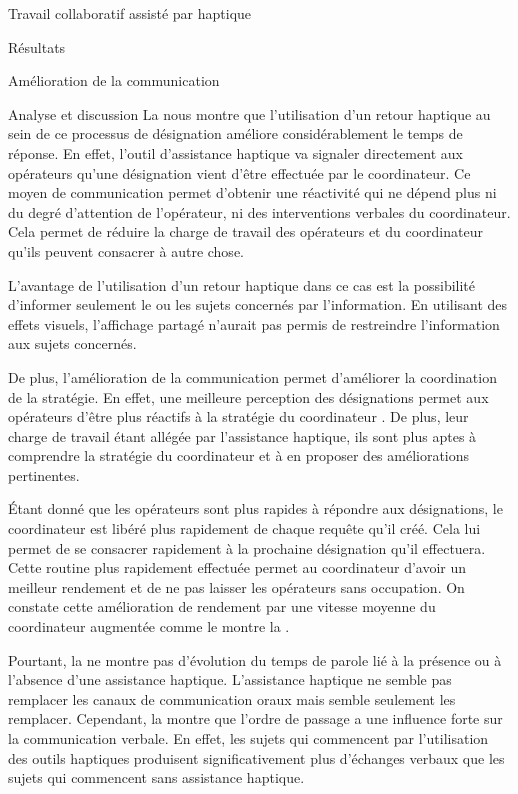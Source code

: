 \documentclass[myfrancais,ngerman,english,frenchb]{mythesis}
\begin{document}
\begin{mychapter}{Travail collaboratif assisté par haptique}
\begin{mysection}{Résultats}
\begin{mysubsection}{Amélioration de la communication}
\begin{mysubsubsection}{Analyse et discussion}
					La  nous montre que l'utilisation d'un retour haptique au sein de ce processus de désignation améliore considérablement le temps de réponse.
					En effet, l'outil d'assistance haptique va signaler directement aux opérateurs qu'une désignation vient d'être effectuée par le coordinateur.
					Ce moyen de communication permet d'obtenir une réactivité qui ne dépend plus ni du degré d'attention de l'opérateur, ni des interventions verbales du coordinateur.
					Cela permet de réduire la charge de travail des opérateurs et du coordinateur qu'ils peuvent consacrer à autre chose.

					L'avantage de l'utilisation d'un retour haptique dans ce cas est la possibilité d'informer seulement le ou les sujets concernés par l'information.
					En utilisant des effets visuels, l'affichage partagé n'aurait pas permis de restreindre l'information aux sujets concernés.

					De plus, l'amélioration de la communication permet d'améliorer la coordination de la stratégie.
					En effet, une meilleure perception des désignations permet aux opérateurs d'être plus réactifs à la stratégie du coordinateur .
					De plus, leur charge de travail étant allégée par l'assistance haptique, ils sont plus aptes à comprendre la stratégie du coordinateur et à en proposer des améliorations pertinentes.

					Étant donné que les opérateurs sont plus rapides à répondre aux désignations, le coordinateur est libéré plus rapidement de chaque requête qu'il créé.
					Cela lui permet de se consacrer rapidement à la prochaine désignation qu'il effectuera.
					Cette routine plus rapidement effectuée permet au coordinateur d'avoir un meilleur rendement et de ne pas laisser les opérateurs sans occupation.
					On constate cette amélioration de rendement par une vitesse moyenne du coordinateur augmentée comme le montre la .

					Pourtant, la  ne montre pas d'évolution du temps de parole lié à la présence ou à l'absence d'une assistance haptique.
					L'assistance haptique ne semble pas remplacer les canaux de communication oraux mais semble seulement les remplacer.
					Cependant, la  montre que l'ordre de passage a une influence forte sur la communication verbale.
					En effet, les sujets qui commencent par l'utilisation des outils haptiques produisent significativement plus d'échanges verbaux que les sujets qui commencent sans assistance haptique.


\end{mysubsubsection}
\end{mysubsection}
\end{mysection}
\end{mychapter}
\end{document}
